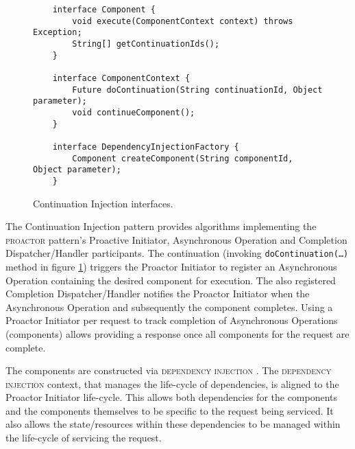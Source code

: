 \documentclass[prodmode]{style/acmlarge}
\begin{document}
\begin{figure}[tp]
\centering
\begin{verbatim}
    interface Component {
        void execute(ComponentContext context) throws Exception;
        String[] getContinuationIds();
    }

    interface ComponentContext {
        Future doContinuation(String continuationId, Object parameter);
        void continueComponent();
    }
    
    interface DependencyInjectionFactory {
        Component createComponent(String componentId, Object parameter);
    }
\end{verbatim}
\caption{Continuation Injection interfaces\footnotemark.}
\label{fig:ContinuationInjectionInterfaces}
\end{figure}

The Continuation Injection pattern provides algorithms implementing the
\textsc{proactor} pattern's Proactive Initiator, Asynchronous Operation and
Completion Dispatcher/Handler participants.  The continuation (invoking
\texttt{doContinuation(\ldots)} method in figure
\ref{fig:ContinuationInjectionInterfaces}) triggers the Proactor Initiator to
register an Asynchronous Operation containing the desired component for
execution.  The also registered Completion Dispatcher/Handler notifies the
Proactor Initiator when the Asynchronous Operation and subsequently the
component completes.  Using a Proactor Initiator per request to track completion
of Asynchronous Operations (components) allows providing a response once all
components for the request are complete.

The components are constructed via \textsc{dependency injection} \cite{ioc}. The
\textsc{dependency injection} context, that manages the life-cycle of
dependencies, is aligned to the Proactor Initiator life-cycle.
This allows both dependencies for the components and the components themselves
to be specific to the request being serviced.  It also allows the
state/resources within these dependencies to be managed within the life-cycle of
servicing the request.
\end{document}
